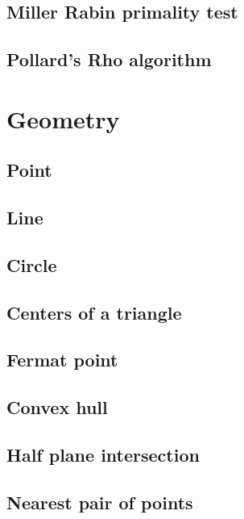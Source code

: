 \documentclass[titlepage, a4paper,10pt]{article}
\begin{document}
\begin{multicols}{2}
\begin{spacing}{0.6}
{			\subsection{Miller Rabin primality test}
				
			\subsection{Pollard's Rho algorithm}
				
		\section{Geometry}
				
			\subsection{Point}
				
			\subsection{Line}
				
			\subsection{Circle}
				
			\subsection{Centers of a triangle}
				
			\subsection{Fermat point}
				
			\subsection{Convex hull}
				
			\subsection{Half plane intersection}
				
			\subsection{Nearest pair of points}
				
}
\end{spacing}
\end{multicols}
\end{document}
